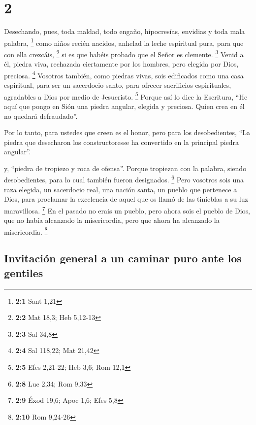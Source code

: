 \hypertarget{section-1}{%
\section{2}\label{section-1}}

 Desechando, pues, toda maldad, todo engaño, hipocresías,
envidias y toda mala palabra, \footnote{\textbf{2:1} Sant 1,21}
 como niños recién nacidos, anhelad la leche espiritual
pura, para que con ella crezcáis, \footnote{\textbf{2:2} Mat 18,3; Heb
  5,12-13}  si es que habéis probado que el Señor es
clemente. \footnote{\textbf{2:3} Sal 34,8}  Venid a él,
piedra viva, rechazada ciertamente por los hombres, pero elegida por
Dios, preciosa. \footnote{\textbf{2:4} Sal 118,22; Mat 21,42}
 Vosotros también, como piedras vivas, sois edificados
como una casa espiritual, para ser un sacerdocio santo, para ofrecer
sacrificios espirituales, agradables a Dios por medio de Jesucristo.
\footnote{\textbf{2:5} Efes 2,21-22; Heb 3,6; Rom 12,1} 
Porque así lo dice la Escritura, ``He aquí que pongo en Sión una piedra
angular, elegida y preciosa. Quien crea en él no quedará defraudado''.

 Por lo tanto, para ustedes que creen es el honor, pero
para los desobedientes, ``La piedra que desecharon los constructoresse
ha convertido en la principal piedra angular''.

 y, ``piedra de tropiezo y roca de ofensa''. Porque
tropiezan con la palabra, siendo desobedientes, para lo cual también
fueron designados. \footnote{\textbf{2:8} Luc 2,34; Rom 9,33}
 Pero vosotros sois una raza elegida, un sacerdocio real,
una nación santa, un pueblo que pertenece a Dios, para proclamar la
excelencia de aquel que os llamó de las tinieblas a su luz maravillosa.
\footnote{\textbf{2:9} Éxod 19,6; Apoc 1,6; Efes 5,8}  En
el pasado no erais un pueblo, pero ahora sois el pueblo de Dios, que no
había alcanzado la misericordia, pero que ahora ha alcanzado la
misericordia. \footnote{\textbf{2:10} Rom 9,24-26}

\hypertarget{invitaciuxf3n-general-a-un-caminar-puro-ante-los-gentiles}{%
\subsection{Invitación general a un caminar puro ante los
gentiles}\label{invitaciuxf3n-general-a-un-caminar-puro-ante-los-gentiles}}

